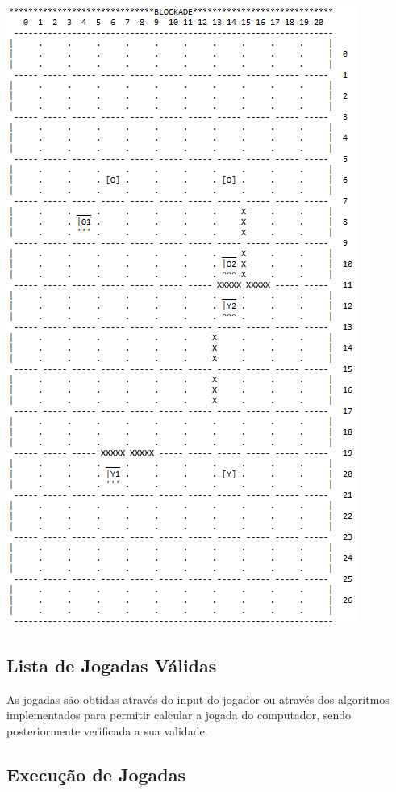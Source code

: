 \documentclass[a4paper]{article}
\begin{document}
\begin{center}
\includegraphics[scale = 0.7]{fig4.png}
\end{center}


\subsection{Lista de Jogadas Válidas} 

As jogadas são obtidas através do input do jogador ou através dos algoritmos implementados para permitir calcular a jogada do computador, sendo posteriormente verificada a sua validade.

\newpage
\subsection{Execução de Jogadas} 
\end{document}
